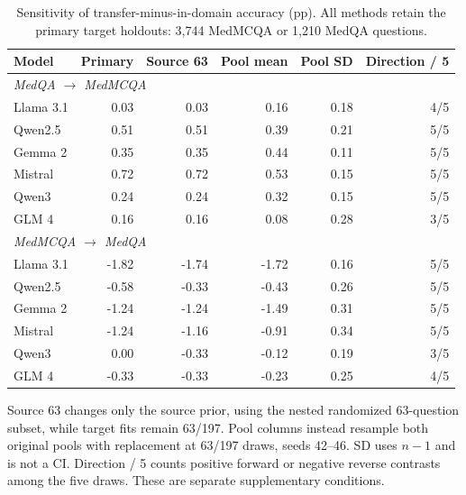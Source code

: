 \begin{table}[htbp]
\centering\small\setlength{\tabcolsep}{5pt}
\caption{Sensitivity of transfer-minus-in-domain accuracy (pp). All methods retain the primary target holdouts: 3,744 MedMCQA or 1,210 MedQA questions.}\label{tab:robustness-transfer-summary}
\begin{tabular}{lrrrrr}
\toprule
Model & Primary & Source 63 & Pool mean & Pool SD & Direction / 5\\
\midrule
\multicolumn{6}{l}{\textit{MedQA $\to$ MedMCQA}}\\
Llama 3.1 & 0.03 & 0.03 & 0.16 & 0.18 & 4/5\\
Qwen2.5 & 0.51 & 0.51 & 0.39 & 0.21 & 5/5\\
Gemma 2 & 0.35 & 0.35 & 0.44 & 0.11 & 5/5\\
Mistral & 0.72 & 0.72 & 0.53 & 0.15 & 5/5\\
Qwen3 & 0.24 & 0.24 & 0.32 & 0.15 & 5/5\\
GLM 4 & 0.16 & 0.16 & 0.08 & 0.28 & 3/5\\
\multicolumn{6}{l}{\textit{MedMCQA $\to$ MedQA}}\\
Llama 3.1 & -1.82 & -1.74 & -1.72 & 0.16 & 5/5\\
Qwen2.5 & -0.58 & -0.33 & -0.43 & 0.26 & 5/5\\
Gemma 2 & -1.24 & -1.24 & -1.49 & 0.31 & 5/5\\
Mistral & -1.24 & -1.16 & -0.91 & 0.34 & 5/5\\
Qwen3 & 0.00 & -0.33 & -0.12 & 0.19 & 3/5\\
GLM 4 & -0.33 & -0.33 & -0.23 & 0.25 & 4/5\\
\bottomrule
\end{tabular}
\par\vspace{3pt}\begin{minipage}{.98\linewidth}\footnotesize Source 63 changes only the source prior, using the nested randomized 63-question subset, while target fits remain 63/197. Pool columns instead resample both original pools with replacement at 63/197 draws, seeds 42--46. SD uses $n-1$ and is not a CI. Direction / 5 counts positive forward or negative reverse contrasts among the five draws. These are separate supplementary conditions.\end{minipage}
\end{table}
